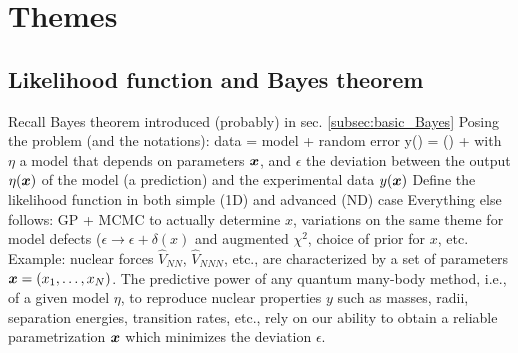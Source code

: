 \section{Themes}  \label{sec:themes}


%
%
%
\subsection{Likelihood function and Bayes theorem}  \label{subsec:L}

\bi
  \I Recall Bayes theorem introduced (probably) in sec. \ref{subsec:basic_Bayes}
  \I Posing the problem (and the notations): data = model + random error
\beq
y() = \eta() + \epsilon
\eeq
with $\eta$ a model that depends on parameters $\boldsymbol{x}$, and $\epsilon$ the 
deviation between the output $\eta(\boldsymbol{x})$ of the model (a prediction) and 
the experimental data $y(\boldsymbol{x})$
  \I Define the likelihood function in both simple (1D) and advanced (ND) case
  \I Everything else follows: GP + MCMC to actually determine $x$, variations on 
     the same theme for model defects ($\epsilon \rightarrow \epsilon + \delta(x)$ 
     and augmented $\chi^2$, choice of prior for $x$, etc.
  \I Example: nuclear forces $\hat{V}_{NN}$, $\hat{V}_{NNN}$, etc., are 
     characterized by a set of parameters $\boldsymbol{x} = (x_1, \dots, x_N)$. The 
     predictive power of any quantum many-body method, i.e., of a given model 
     $\eta$, to reproduce nuclear properties $y$ such as masses, radii, 
     separation energies, transition rates, etc., rely on our ability to obtain a 
     reliable parametrization $\boldsymbol{x}$ which minimizes the deviation $\epsilon$.
\ei

